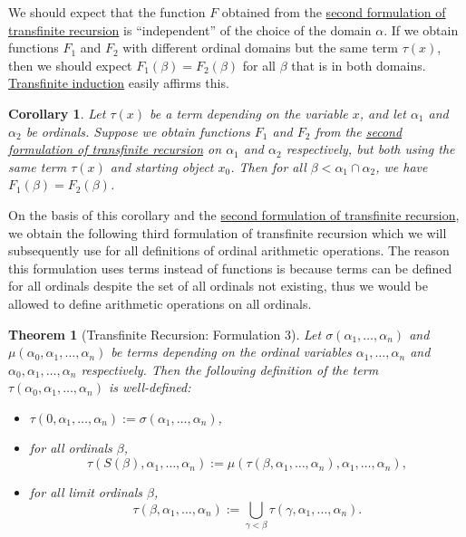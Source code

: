 \documentclass[a4paper,11pt]{article}
\theoremstyle{plain}
\newtheorem{thm}{Theorem}[subsection]
\newtheorem*{cor}{Corollary}
\theoremstyle{definition}
\theoremstyle{remark}
\begin{document}
We should expect that the function $F$ obtained from the \hyperref[thm:Trecursion2]{second formulation of transfinite recursion} is ``independent'' of the choice of the domain $\alpha$. If we obtain functions $F_1$ and $F_2$ with different ordinal domains but the same term $\tau(x)$, then we should expect $F_1(\beta) = F_2(\beta)$ for all $\beta$ that is in both domains. \hyperref[thm:Tinduction1]{Transfinite induction} easily affirms this.

\begin{cor}
Let $\tau(x)$ be a term depending on the variable $x$, and let $\alpha_1$ and $\alpha_2$ be ordinals. Suppose we obtain functions $F_1$ and $F_2$ from the \hyperref[thm:Trecursion2]{second formulation of transfinite recursion} on $\alpha_1$ and $\alpha_2$ respectively, but both using the same term $\tau(x)$ and starting object $x_0$. Then for all $\beta < \alpha_1 \cap \alpha_2$, we have $F_1(\beta) = F_2(\beta)$.
\end{cor}

On the basis of this corollary and the \hyperref[thm:Trecursion2]{second formulation of transfinite recursion}, we obtain the following third formulation of transfinite recursion which we will subsequently use for all definitions of ordinal arithmetic operations. The reason this formulation uses terms instead of functions is because terms can be defined for all ordinals despite the set of all ordinals not existing, thus we would be allowed to define arithmetic operations on all ordinals.

\begin{thm}[Transfinite Recursion: Formulation 3]
\label{thm:Trecursion3}
Let $\sigma(\alpha_1,\dots,\alpha_n)$ and $\mu(\alpha_0,\alpha_1,\dots,\alpha_n)$ be terms depending on the ordinal variables $\alpha_1,\dots,\alpha_n$ and $\alpha_0,\alpha_1,\dots,\alpha_n$ respectively. Then the following definition of the term $\tau(\alpha_0,\alpha_1,\dots,\alpha_n)$ is well-defined:
\begin{itemize}
\item $\tau(0,\alpha_1,\dots,\alpha_n) := \sigma(\alpha_1,\dots,\alpha_n)$,
\item for all ordinals $\beta$,
\[\tau(S(\beta),\alpha_1,\dots,\alpha_n) := \mu(\tau(\beta,\alpha_1,\dots,\alpha_n), \alpha_1,\dots,\alpha_n),\]
\item for all limit ordinals $\beta$,
\[\tau(\beta,\alpha_1,\dots,\alpha_n) := \bigcup_{\gamma<\beta}\tau(\gamma,\alpha_1,\dots,\alpha_n).\]
\end{itemize}
\end{thm}
\end{document}
